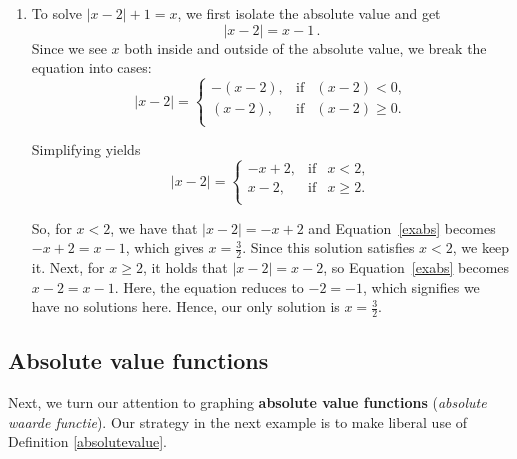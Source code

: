 \begin{example}
\begin{enumerate}
\item  To solve $|x-2| + 1 = x$, we first isolate the absolute value and get 
\begin{equation}
|x-2| = x-1\,.
\label{exabs}
\end{equation}
  Since we see $x$ both inside and outside of the absolute value, we break the equation into cases:   \[ |x-2| = \left\{ \begin{array}{rcl} -(x-2), & \mbox{if} & (x-2) < 0,  \\ (x-2), & \mbox{if} & (x-2) \geq 0. \\ \end{array} \right.\]

Simplifying yields 
\[ |x-2| = \left\{ \begin{array}{rcl} -x+2, & \mbox{if} & x < 2, \\ x-2, & \mbox{if} & x \geq 2. \\ \end{array} \right.\]

So, for $x<2$, we have that $|x-2| = -x+2$ and Equation~\eqref{exabs} becomes $-x+2 = x-1$, which gives $x = \frac{3}{2}$.  Since this solution satisfies $x < 2$, we keep it.  Next, for $x \geq 2$, it holds that $|x-2| = x-2$, so Equation~\eqref{exabs} becomes $x-2 = x-1$.  Here, the equation reduces to $-2 = -1$, which signifies we have no solutions here.  Hence, our only solution is $x = \frac{3}{2}$.  
\end{enumerate}
\end{example}
\fi


\subsection{Absolute value functions}
Next, we turn our attention to graphing \textbf{absolute value functions} (\textit{absolute waarde functie}). Our strategy in the next example is to make liberal use of Definition \ref{absolutevalue}. 

